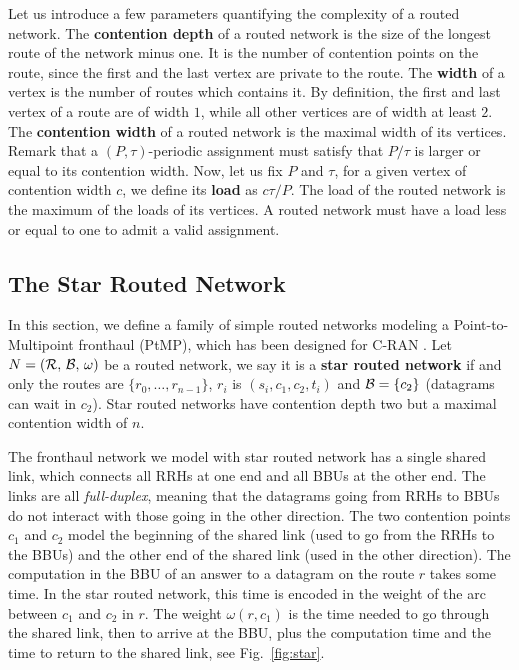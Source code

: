 \documentclass[a4paper,10pt]{article}
\begin{document}
  	Let us introduce a few parameters quantifying the complexity of a routed network.
	The \textbf{contention depth} of a routed network is the size of the longest route of the network minus one. It is the number of contention points on the route, since the first and the last vertex are private to the route. The \textbf{width} of a vertex is the number of routes which contains it. By definition, 
	the first and last vertex of a route are of width $1$, while all other vertices are of width at least $2$.
	The \textbf{contention width} of a routed network is the maximal width of its vertices. 
	Remark that a $(P,\tau)$-periodic assignment must satisfy that $P/\tau$ is larger or equal to its contention width. Now, let us fix $P$ and $\tau$, for a given vertex of contention width $c$, we define its \textbf{load} as $c\tau/P$. The load of the routed network is the maximum of the loads of its vertices. A routed network must have a load less or equal to one to admit a valid assignment.



    \subsection{The Star Routed Network} \label{sec:star_routed_network}
  
	In this section, we define a family of simple routed networks modeling a Point-to-Multipoint fronthaul (PtMP), which has been designed for C-RAN \cite{tayq2017real}. Let $N = (\cal{R},\,\cal{B},\,\omega)$ be a routed network, we say it is a \textbf{star routed network} if and only the routes are $\{r_0,\dots,r_{n-1}\}$, $r_i$ is $(s_i,c_1,c_2,t_i)$ and ${\cal B} = \{ c_2 \}$ (datagrams can wait in $c_2$). Star routed networks have contention depth two but a maximal contention width of $n$.

	The fronthaul network we model with star routed network has a single shared link, which connects all RRHs at one end and all BBUs at the other end. The links are all \emph{full-duplex}, meaning that the datagrams going from RRHs to BBUs do not interact with those going in the other direction. 
	The two contention points $c_1$ and $c_2$ model the beginning of the shared link (used to go from the RRHs to the BBUs) and the other end of the shared link (used in the other direction). 
	The computation in the BBU of an answer to a datagram on the route $r$ takes some time.
	In the star routed network, this time is encoded in the weight of the arc between $c_1$ and $c_2$ in $r$. The weight $\omega(r,c_1)$ is the time needed to go through the shared link, then to arrive at the BBU, plus the computation time and the time to return to the shared link, see Fig.~\ref{fig:star}.
\end{document}
